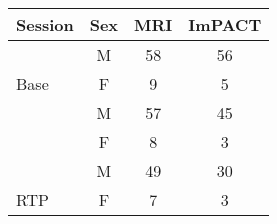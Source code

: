 
\begin{tabular}{lccc}
Session & \multicolumn{1}{l}{Sex} & \multicolumn{1}{l}{MRI} & \multicolumn{1}{l}{ImPACT} \\ \hline
 & M & 58 & 56 \\
\multirow{-2}{*}{Base} & \cellcolor[HTML]{C0C0C0}F & \cellcolor[HTML]{C0C0C0}9 & \cellcolor[HTML]{C0C0C0}5 \\
\rowcolor[HTML]{EFEFEF}
\cellcolor[HTML]{EFEFEF} & M & 57 & 45 \\
\rowcolor[HTML]{C0C0C0}
\multirow{-2}{*}{\cellcolor[HTML]{EFEFEF}Post} & {\color[HTML]{333333} F} & {\color[HTML]{333333} 8} & {\color[HTML]{333333} 3} \\
 & M & 49 & 30 \\
\multirow{-2}{*}{RTP} & \cellcolor[HTML]{C0C0C0}F & \cellcolor[HTML]{C0C0C0}7 & \cellcolor[HTML]{C0C0C0}3
\end{tabular}

